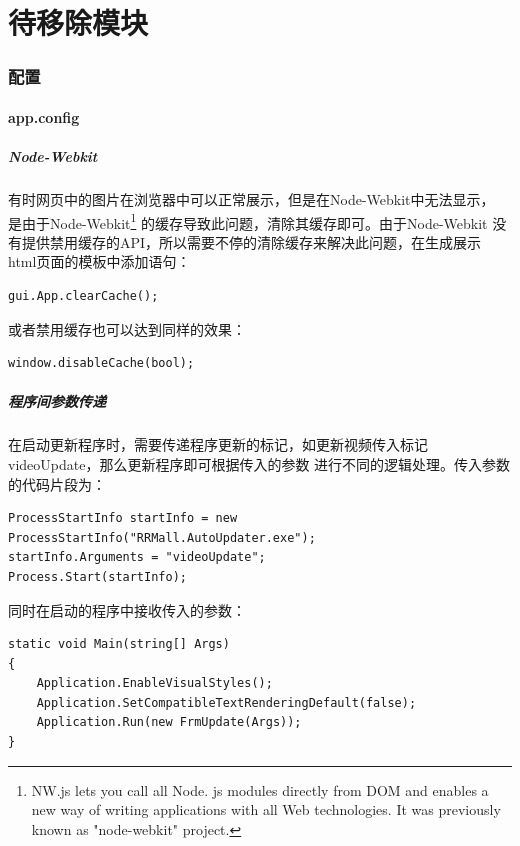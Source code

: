 \documentclass{book}
\begin{document}
\part{待移除模块}
	
\clearpage
\mbox{}         
\clearpage

\section{配置}

\subsection{app.config}

\subsubsection{Node-Webkit}

有时网页中的图片在浏览器中可以正常展示，但是在Node-Webkit中无法显示，
是由于Node-Webkit\footnote{NW.js lets you call all Node.
js modules directly from DOM and enables a new way of 
writing applications with all Web technologies. 
It was previously known as "node-webkit" project.}
的缓存导致此问题，清除其缓存即可。由于Node-Webkit
没有提供禁用缓存的API，所以需要不停的清除缓存来解决此问题，在生成展示
html页面的模板中添加语句：

\begin{lstlisting}
gui.App.clearCache();
\end{lstlisting}
或者禁用缓存也可以达到同样的效果：
\begin{lstlisting}
window.disableCache(bool);
\end{lstlisting}

\subsubsection{程序间参数传递}

在启动更新程序时，需要传递程序更新的标记，如更新视频传入标记videoUpdate，那么更新程序即可根据传入的参数
进行不同的逻辑处理。传入参数的代码片段为：
\begin{lstlisting}
ProcessStartInfo startInfo = new ProcessStartInfo("RRMall.AutoUpdater.exe");
startInfo.Arguments = "videoUpdate";
Process.Start(startInfo);
\end{lstlisting}

同时在启动的程序中接收传入的参数：
\begin{lstlisting}
static void Main(string[] Args)
{  
    Application.EnableVisualStyles();
    Application.SetCompatibleTextRenderingDefault(false);
    Application.Run(new FrmUpdate(Args));    
}
\end{lstlisting}
\end{document}
